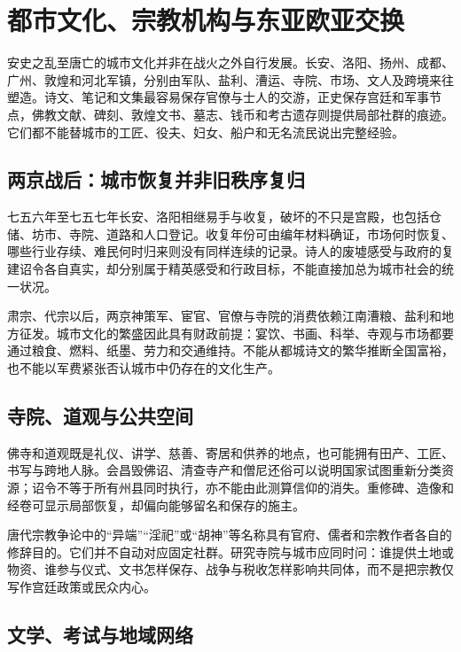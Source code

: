 \section{都市文化、宗教机构与东亚欧亚交换}
\label{sec:late-tang-urban-culture-exchange}

安史之乱至唐亡的城市文化并非在战火之外自行发展。长安、洛阳、扬州、成都、广州、敦煌和河北军镇，分别由军队、盐利、漕运、寺院、市场、文人及跨境来往塑造。诗文、笔记和文集最容易保存官僚与士人的交游，正史保存宫廷和军事节点，佛教文献、碑刻、敦煌文书、墓志、钱币和考古遗存则提供局部社群的痕迹。它们都不能替城市的工匠、役夫、妇女、船户和无名流民说出完整经验。

\subsection{两京战后：城市恢复并非旧秩序复归}

七五六年至七五七年长安、洛阳相继易手与收复，破坏的不只是宫殿，也包括仓储、坊市、寺院、道路和人口登记。收复年份可由编年材料确证，市场何时恢复、哪些行业存续、难民何时归来则没有同样连续的记录。诗人的废墟感受与政府的复建诏令各自真实，却分别属于精英感受和行政目标，不能直接加总为城市社会的统一状况。

肃宗、代宗以后，两京神策军、宦官、官僚与寺院的消费依赖江南漕粮、盐利和地方征发。城市文化的繁盛因此具有财政前提：宴饮、书画、科举、寺观与市场都要通过粮食、燃料、纸墨、劳力和交通维持。不能从都城诗文的繁华推断全国富裕，也不能以军费紧张否认城市中仍存在的文化生产。

\subsection{寺院、道观与公共空间}

佛寺和道观既是礼仪、讲学、慈善、寄居和供养的地点，也可能拥有田产、工匠、书写与跨地人脉。会昌毁佛诏、清查寺产和僧尼还俗可以说明国家试图重新分类资源；诏令不等于所有州县同时执行，亦不能由此测算信仰的消失。重修碑、造像和经卷可显示局部恢复，却偏向能够留名和保存的施主。

唐代宗教争论中的“异端”“淫祀”或“胡神”等名称具有官府、儒者和宗教作者各自的修辞目的。它们并不自动对应固定社群。研究寺院与城市应同时问：谁提供土地或物资、谁参与仪式、文书怎样保存、战争与税收怎样影响共同体，而不是把宗教仅写作宫廷政策或民众内心。

\subsection{文学、考试与地域网络}

